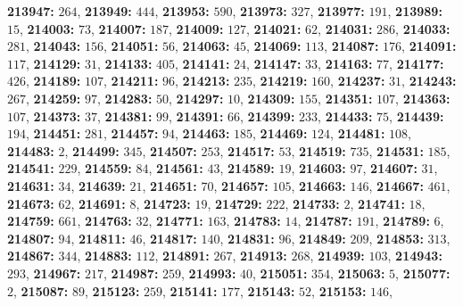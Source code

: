 \textsf{\bfseries 213947:} $264$, \textsf{\bfseries 213949:} $444$, \textsf{\bfseries 213953:} $590$, \textsf{\bfseries 213973:} $327$, \textsf{\bfseries 213977:} $191$, \textsf{\bfseries 213989:} $15$, \textsf{\bfseries 214003:} $73$, \textsf{\bfseries 214007:} $187$, \textsf{\bfseries 214009:} $127$, \textsf{\bfseries 214021:} $62$, \textsf{\bfseries 214031:} $286$, \textsf{\bfseries 214033:} $281$, \textsf{\bfseries 214043:} $156$, \textsf{\bfseries 214051:} $56$, \textsf{\bfseries 214063:} $45$, \textsf{\bfseries 214069:} $113$, \textsf{\bfseries 214087:} $176$, \textsf{\bfseries 214091:} $117$, \textsf{\bfseries 214129:} $31$, \textsf{\bfseries 214133:} $405$, \textsf{\bfseries 214141:} $24$, \textsf{\bfseries 214147:} $33$, \textsf{\bfseries 214163:} $77$, \textsf{\bfseries 214177:} $426$, \textsf{\bfseries 214189:} $107$, \textsf{\bfseries 214211:} $96$, \textsf{\bfseries 214213:} $235$, \textsf{\bfseries 214219:} $160$, \textsf{\bfseries 214237:} $31$, \textsf{\bfseries 214243:} $267$, \textsf{\bfseries 214259:} $97$, \textsf{\bfseries 214283:} $50$, \textsf{\bfseries 214297:} $10$, \textsf{\bfseries 214309:} $155$, \textsf{\bfseries 214351:} $107$, \textsf{\bfseries 214363:} $107$, \textsf{\bfseries 214373:} $37$, \textsf{\bfseries 214381:} $99$, \textsf{\bfseries 214391:} $66$, \textsf{\bfseries 214399:} $233$, \textsf{\bfseries 214433:} $75$, \textsf{\bfseries 214439:} $194$, \textsf{\bfseries 214451:} $281$, \textsf{\bfseries 214457:} $94$, \textsf{\bfseries 214463:} $185$, \textsf{\bfseries 214469:} $124$, \textsf{\bfseries 214481:} $108$, \textsf{\bfseries 214483:} $2$, \textsf{\bfseries 214499:} $345$, \textsf{\bfseries 214507:} $253$, \textsf{\bfseries 214517:} $53$, \textsf{\bfseries 214519:} $735$, \textsf{\bfseries 214531:} $185$, \textsf{\bfseries 214541:} $229$, \textsf{\bfseries 214559:} $84$, \textsf{\bfseries 214561:} $43$, \textsf{\bfseries 214589:} $19$, \textsf{\bfseries 214603:} $97$, \textsf{\bfseries 214607:} $31$, \textsf{\bfseries 214631:} $34$, \textsf{\bfseries 214639:} $21$, \textsf{\bfseries 214651:} $70$, \textsf{\bfseries 214657:} $105$, \textsf{\bfseries 214663:} $146$, \textsf{\bfseries 214667:} $461$, \textsf{\bfseries 214673:} $62$, \textsf{\bfseries 214691:} $8$, \textsf{\bfseries 214723:} $19$, \textsf{\bfseries 214729:} $222$, \textsf{\bfseries 214733:} $2$, \textsf{\bfseries 214741:} $18$, \textsf{\bfseries 214759:} $661$, \textsf{\bfseries 214763:} $32$, \textsf{\bfseries 214771:} $163$, \textsf{\bfseries 214783:} $14$, \textsf{\bfseries 214787:} $191$, \textsf{\bfseries 214789:} $6$, \textsf{\bfseries 214807:} $94$, \textsf{\bfseries 214811:} $46$, \textsf{\bfseries 214817:} $140$, \textsf{\bfseries 214831:} $96$, \textsf{\bfseries 214849:} $209$, \textsf{\bfseries 214853:} $313$, \textsf{\bfseries 214867:} $344$, \textsf{\bfseries 214883:} $112$, \textsf{\bfseries 214891:} $267$, \textsf{\bfseries 214913:} $268$, \textsf{\bfseries 214939:} $103$, \textsf{\bfseries 214943:} $293$, \textsf{\bfseries 214967:} $217$, \textsf{\bfseries 214987:} $259$, \textsf{\bfseries 214993:} $40$, \textsf{\bfseries 215051:} $354$, \textsf{\bfseries 215063:} $5$, \textsf{\bfseries 215077:} $2$, \textsf{\bfseries 215087:} $89$, \textsf{\bfseries 215123:} $259$, \textsf{\bfseries 215141:} $177$, \textsf{\bfseries 215143:} $52$, \textsf{\bfseries 215153:} $146$, 
